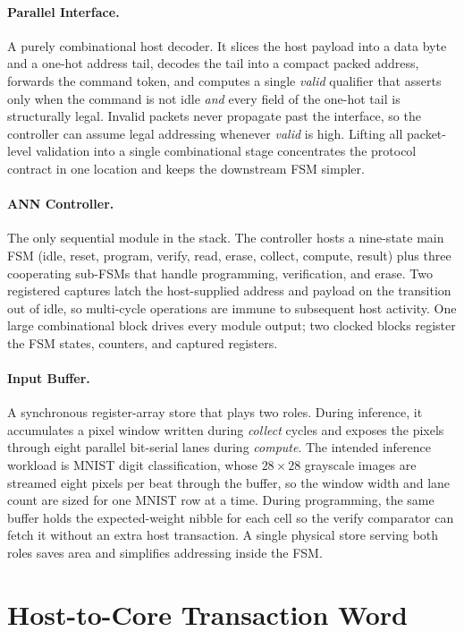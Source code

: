 \paragraph{Parallel Interface.}
A purely combinational host decoder. It slices the host payload into a
data byte and a one-hot address tail, decodes the tail into a compact
packed address, forwards the command token, and computes a single
\emph{valid} qualifier that asserts only when the command is not idle
\emph{and} every field of the one-hot tail is structurally legal.
Invalid packets never propagate past the interface, so the controller
can assume legal addressing whenever \emph{valid} is high. Lifting all
packet-level validation into a single combinational stage concentrates
the protocol contract in one location and keeps the downstream FSM
simpler.

\paragraph{ANN Controller.}
The only sequential module in the stack. The controller hosts a
nine-state main FSM (idle, reset, program, verify, read, erase, collect,
compute, result) plus three cooperating sub-FSMs that handle programming,
verification, and erase. Two registered captures latch the
host-supplied address and payload on the transition out of idle, so
multi-cycle operations are immune to subsequent host activity. One large
combinational block drives every module output; two clocked blocks
register the FSM states, counters, and captured registers.

\paragraph{Input Buffer.}
A synchronous register-array store that plays two roles. During
inference, it accumulates a pixel window written during \emph{collect}
cycles and exposes the pixels through eight parallel bit-serial lanes
during \emph{compute}. The intended inference workload is MNIST digit
classification, whose $28\times28$ grayscale images are streamed eight
pixels per beat through the buffer, so the window width and lane count
are sized for one MNIST row at a time. During programming, the same
buffer holds the expected-weight nibble for each cell so the verify
comparator can fetch it without an extra host transaction. A single
physical store serving both roles saves area and simplifies addressing
inside the FSM.

\section{Host-to-Core Transaction Word}
\label{sec:arch-word}

